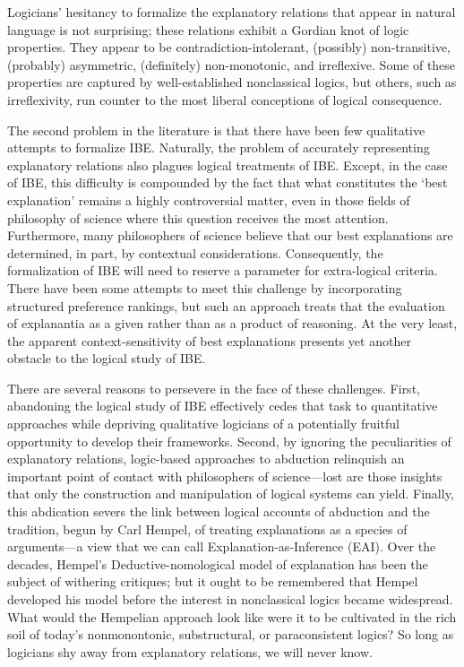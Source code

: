 \documentclass{article}
\theoremstyle{definition}
\theoremstyle{definition}
\theoremstyle{definition}
\theoremstyle{definition}
\theoremstyle{remark}
\theoremstyle{definition}
\theoremstyle{definition}
\begin{document}
  Logicians' hesitancy to formalize the explanatory relations that appear in natural language is not surprising; these relations exhibit a Gordian knot of logic properties. They appear to be contradiction-intolerant, (possibly) non-transitive, (probably) asymmetric, (definitely) non-monotonic, and irreflexive. Some of these properties are captured by well-established nonclassical logics, but others, such as irreflexivity,  run counter to the most liberal conceptions of logical consequence.
 
 The second problem in the literature is that there have been few qualitative attempts to formalize IBE. Naturally, the problem of accurately representing explanatory relations also plagues logical treatments of IBE. Except, in the case of IBE, this difficulty is compounded by the fact that what constitutes the `best explanation' remains a highly controversial matter, even in those fields of philosophy of science where this question receives the most  attention.  Furthermore, many philosophers of science believe that our best explanations are determined, in part, by contextual considerations.  Consequently, the formalization of IBE will need to reserve a parameter for extra-logical criteria. There have been some attempts to meet this challenge by incorporating structured preference rankings, but such an approach treats that the evaluation of explanantia as a given rather than as a product of reasoning. At the very least, the apparent context-sensitivity of best explanations presents yet another obstacle to the logical study of IBE. 
 
 There are several reasons to persevere in the face of these challenges. First, abandoning the logical study of IBE effectively cedes that task to quantitative approaches while depriving qualitative logicians of a potentially fruitful opportunity to develop their frameworks. Second, by ignoring the peculiarities of explanatory relations, logic-based approaches to abduction relinquish an important point of contact with philosophers of science---lost are those insights that only the construction and manipulation of logical systems can yield. Finally, this abdication severs the link between logical accounts of abduction and the tradition, begun by Carl Hempel, of treating explanations as a species of arguments---a view that we can call Explanation-as-Inference (EAI). Over the decades, Hempel's Deductive-nomological model of explanation has been the subject of withering critiques; but it ought to be remembered that Hempel developed his model before the interest in nonclassical logics became widespread. What would the Hempelian approach look like were it to be cultivated in the rich soil of today's nonmonontonic, substructural, or paraconsistent logics? So long as logicians shy away from explanatory relations, we will never know.
 
\end{document}
